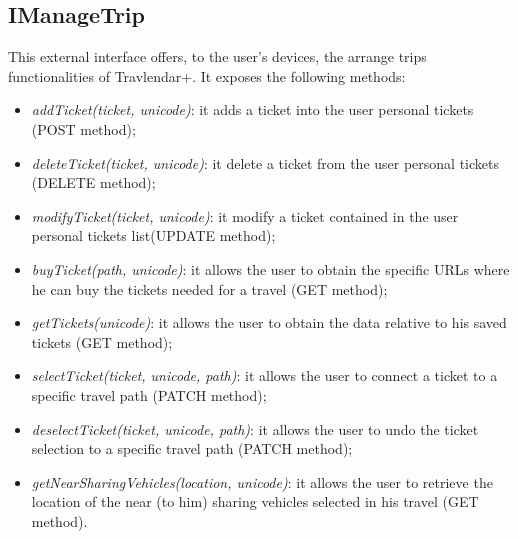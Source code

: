 \subsection{IManageTrip}
\label{subsect:IManageTrip}
This external interface offers, to the user's devices, the arrange trips functionalities of Travlendar+. It exposes the following methods:
\begin{itemize}
	\item \textit{addTicket(ticket, unicode)}: it adds a ticket into the user personal tickets (POST method);
	\item \textit{deleteTicket(ticket, unicode)}: it delete a ticket from the user personal tickets (DELETE method);
	\item \textit{modifyTicket(ticket, unicode)}: it modify a ticket contained in the user personal tickets list(UPDATE method);
	\item \textit{buyTicket(path, unicode)}: it allows the user to obtain the specific URLs where he can buy the tickets needed for a travel (GET method);
	\item \textit{getTickets(unicode)}: it allows the user to obtain the data relative to his saved tickets (GET method);
	\item \textit{selectTicket(ticket, unicode, path)}: it allows the user to connect a ticket to a specific travel path (PATCH method);
	\item \textit{deselectTicket(ticket, unicode, path)}: it allows the user to undo the ticket selection to a specific travel path (PATCH method);
	\item \textit{getNearSharingVehicles(location, unicode)}: it allows the user to retrieve the location of the near (to him) sharing vehicles selected in his travel (GET method).
\end{itemize}

